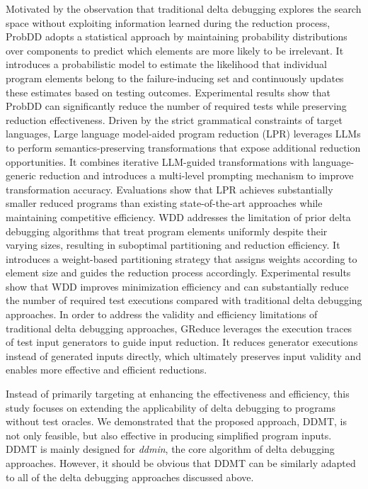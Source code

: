 Motivated by the observation that traditional delta debugging explores the search space without exploiting information learned during the reduction process, ProbDD \cite{wang2021} adopts a statistical approach by maintaining probability distributions over components to predict which elements are more likely to be irrelevant.
It introduces a probabilistic model to estimate the likelihood that individual program elements belong to the failure-inducing set and continuously updates these estimates based on testing outcomes. 
Experimental results show that ProbDD can significantly reduce the number of required tests while preserving reduction effectiveness.
Driven by the strict grammatical constraints of target languages, Large language model-aided program reduction (LPR) \cite{zhang2024lpr} leverages LLMs to perform semantics-preserving transformations that expose additional reduction opportunities.
It combines iterative LLM-guided transformations with language-generic reduction and introduces a multi-level prompting mechanism to improve transformation accuracy. Evaluations show that LPR achieves substantially smaller reduced programs than existing state-of-the-art approaches while maintaining competitive efficiency.
WDD \cite{zhou2025wdd} addresses the limitation of prior delta debugging algorithms that treat program elements uniformly despite their varying sizes, resulting in suboptimal partitioning and reduction efficiency.
It introduces a weight-based partitioning strategy that assigns weights according to element size and guides the reduction process accordingly. Experimental results show that WDD improves minimization efficiency and can substantially reduce the number of required test executions compared with traditional delta debugging approaches.
In order to address the validity and efficiency limitations of traditional delta debugging approaches, GReduce \cite{ren2025} leverages the execution traces of test input generators to guide input reduction. It reduces generator executions instead of generated inputs directly, which ultimately preserves input validity and enables more effective and efficient reductions.


Instead of primarily targeting at enhancing the effectiveness and efficiency, this study focuses on extending the applicability of delta debugging to programs without test oracles. We demonstrated that the proposed approach, DDMT, is not only feasible, but also effective in producing simplified program inputs. 
DDMT is mainly designed for \emph{ddmin}, the core algorithm of delta debugging approaches. However, it should be obvious that DDMT can be similarly adapted to all of the delta debugging approaches discussed above.


